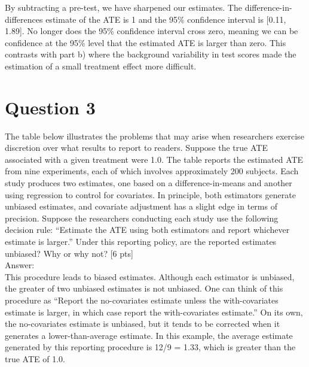 \documentclass[11pt,notitlepage]{article}\usepackage[]{graphicx}\usepackage[]{color}
\begin{document}
\begin{enumerate}[a)]
By subtracting a pre-test, we have sharpened our estimates.  The difference-in-differences estimate of the ATE is 1 and the 95\% confidence interval is [0.11, 1.89].  No longer does the 95\% confidence interval cross zero, meaning we can be confidence at the 95\% level that the estimated ATE is larger than zero. This contrasts with part b) where the background variability in test scores made the estimation of a small treatment effect more difficult.

\end{enumerate}

\section*{Question 3}
The table below illustrates the problems that may arise when researchers exercise discretion over what results to report to readers. Suppose the true ATE associated with a given treatment were 1.0. The table reports the estimated ATE from nine experiments, each of which involves approximately 200 subjects. Each study produces two estimates, one based on a difference-in-means and another using regression to control for covariates. In principle, both estimators generate unbiased estimates, and covariate adjustment has a slight edge in terms of precision. Suppose the researchers conducting each study use the following decision rule: ``Estimate the ATE using both estimators and report whichever estimate is larger.'' Under this reporting policy, are the reported estimates unbiased? Why or why not? [6 pts]\\
Answer:\\
This procedure leads to biased estimates. Although each estimator is unbiased, the greater of two unbiased estimates is not unbiased. One can think of this procedure as ``Report the no-covariates estimate unless the with-covariates estimate is larger, in which case report the with-covariates estimate.'' On its own, the no-covariates estimate is unbiased, but it tends to be corrected when it generates a lower-than-average estimate. In this example, the average estimate generated by this reporting procedure is 12/9 = 1.33, which is greater than the true ATE of 1.0.
\end{document}
